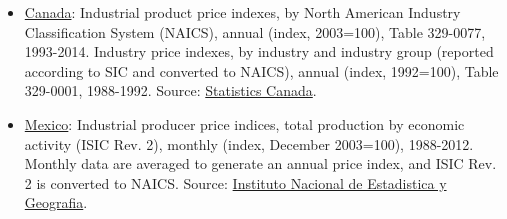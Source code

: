 \documentclass[11pt]{article}
\begin{document}
\begin{spacing}{1}
\begin{itemize}
	\item \underline{Canada}: Industrial product price indexes, by North American Industry Classification System (NAICS), annual (index, 2003=100), Table 329-0077, 1993-2014. Industry price indexes, by industry and industry group (reported according to SIC and converted to NAICS), annual (index, 1992=100), Table 329-0001, 1988-1992. Source: \href{http://www5.statcan.gc.ca/cansim/a47}{Statistics Canada}. %

	\item \underline{Mexico}: Industrial producer price indices, total production by economic activity (ISIC Rev. 2), monthly (index, December 2003=100), 1988-2012. Monthly data are averaged to generate an annual price index, and ISIC Rev. 2 is converted to NAICS. Source: \href{http://www.inegi.org.mx/est/contenidos/proyectos/inp/INPP_CAB2003.aspx}{Instituto Nacional de Estadistica y Geografia}. %
	
	\end{itemize}


	
	
	

\end{spacing}
\end{document}
